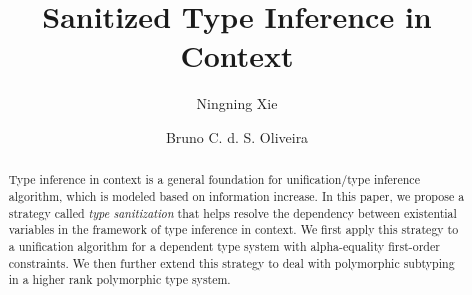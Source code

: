 \documentclass[oribibl]{llncs}
\begin{document}
\title{Sanitized Type Inference in Context}

\author{Ningning Xie \and Bruno C. d. S. Oliveira}

\maketitle

\begin{abstract}
  Type inference in context is a general foundation for unification/type
  inference algorithm, which is modeled based on information increase. In this
  paper, we propose a strategy called \textit{type sanitization} that helps
  resolve the dependency between existential variables in the framework of type
  inference in context. We first apply this strategy to a unification algorithm
  for a dependent type system with alpha-equality first-order constraints. We
  then further extend this strategy to deal with polymorphic subtyping in a
  higher rank polymorphic type system.
\end{abstract}












% 



\appendix

% 
\end{document}
